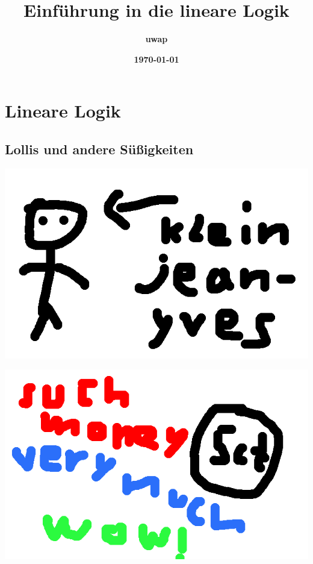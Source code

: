 \documentclass{beamer}
\title{\textbf{Einführung in die lineare Logik}}
\author{\textbf{uwap}}
\date{\textbf{\today}}
\begin{document}
\begin{frame}
  \titlepage%
\end{frame}


\section{Lineare Logik}
\subsection{Lollis und andere Süßigkeiten}

\begin{frame}
  \includegraphics[width=\framewidth]{comic1.png}
\end{frame}
\begin{frame}
  \includegraphics[width=\framewidth]{comic2.png}
\end{frame}
\end{document}
